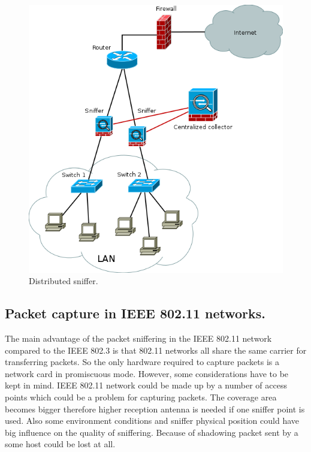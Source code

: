 \documentclass[thesis=M,english]{FITthesis}[2011/07/15]
\begin{document}
\begin{itemize}
\begin{figure}[h]
\centering
\includegraphics[scale=0.6]{images/distributed_sniffering.png}
\caption{Distributed sniffer.}
\label{fig:distributed_sniffering}
\end{figure}
\end{itemize}
\subsection{Packet capture in IEEE 802.11 networks.}
The main advantage of the packet sniffering in the IEEE 802.11 network compared to the IEEE 802.3 is that 802.11 networks all share the same carrier for transferring packets. So the only hardware required to capture packets is a network card in promiscuous mode. However, some considerations have to be kept in mind. IEEE 802.11 network could be made up by a number of access points which could be a problem for capturing packets. The coverage area becomes bigger therefore higher reception antenna is needed if one sniffer point is used. Also some environment conditions and sniffer physical position could have big influence on the quality of sniffering. Because of shadowing packet sent by a some host could be lost at all.
\end{document}
